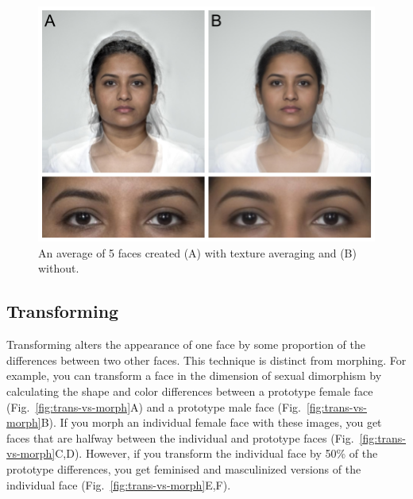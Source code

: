 \documentclass[
  doc,floatsintext]{apa6}
\begin{document}
\begin{figure}
\includegraphics[width=1\linewidth]{index_files/figure-latex/avg-texture-1} \caption{An average of 5 faces created (A) with texture averaging and (B) without.}\label{fig:avg-texture}
\end{figure}

\hypertarget{transforming}{%
\subsection{Transforming}\label{transforming}}

Transforming alters the appearance of one face by some proportion of the differences between two other faces. This technique is distinct from morphing. For example, you can transform a face in the dimension of sexual dimorphism by calculating the shape and color differences between a prototype female face (Fig.~\ref{fig:trans-vs-morph}A) and a prototype male face (Fig.~\ref{fig:trans-vs-morph}B). If you morph an individual female face with these images, you get faces that are halfway between the individual and prototype faces (Fig.~\ref{fig:trans-vs-morph}C,D). However, if you transform the individual face by 50\% of the prototype differences, you get feminised and masculinized versions of the individual face (Fig.~\ref{fig:trans-vs-morph}E,F).
\end{document}
